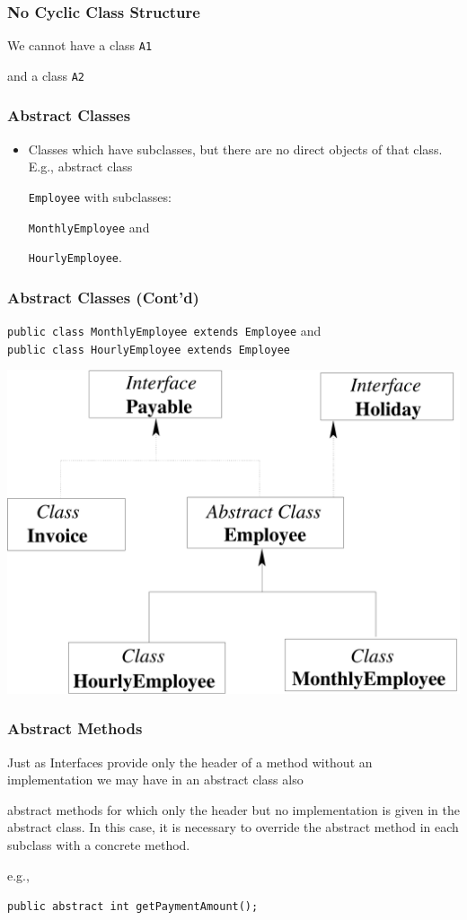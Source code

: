 \documentclass{beamer}
\def\mcolor#1#2{\rule{0ex}{0ex}\color{#1}#2\color{black}{}}
\begin{document}
\begin{frame}
\frametitle{No Cyclic Class Structure}
We cannot have a class \texttt{A1}

and a class \texttt{A2}

\end{frame}

\begin{frame}
\frametitle{Abstract Classes}

\begin{itemize}
\item Classes which have subclasses, but there are no direct objects
  of that class. E.g., abstract
  class \mcolor{blue}{\texttt{Employee}} with subclasses:
\mcolor{blue}{\texttt{MonthlyEmployee}} and
\mcolor{blue}{\texttt{HourlyEmployee}}.
\end{itemize}
\end{frame}

\begin{frame}
\frametitle{Abstract Classes (Cont'd)}

\texttt{public class MonthlyEmployee extends Employee} and\\
\texttt{public class HourlyEmployee extends Employee}

\begin{center}
\includegraphics[height=.65\textheight]{structure}
\end{center}

\end{frame}
\begin{frame}
\frametitle{Abstract Methods} 

Just as Interfaces provide only the header of a method without an
implementation we may have in an abstract class also
\mcolor{blue}{abstract methods} for which only the header but no
implementation is given in the abstract class. In this case, it is
necessary to override the abstract method in each subclass with a
concrete method.

e.g., \mcolor{blue}{\texttt{public abstract int getPaymentAmount();}}

\end{frame}
\end{document}
